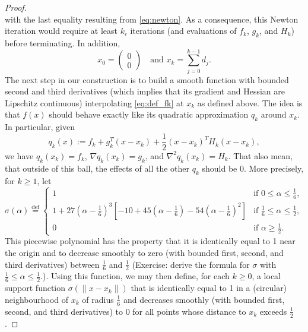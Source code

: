 \documentclass[10pt,a4paper]{article}
\begin{document}
\begin{proof}
\begin{equation*}
	\end{equation*}
	with the last equality resulting from \eqref{eq:newton}. As a consequence, this Newton iteration would require at least $k_\epsilon$ iterations (and evaluations of $f_k$, $g_k$, and $H_k$) before terminating. In addition,
	\begin{equation*}
		x_0 = \begin{pmatrix} 0 \\ 0 \end{pmatrix} \quad \text{and } x_k = \sum_{j=0}^{k-1} d_j. 
	\end{equation*}
	The next step in our construction is to build a smooth function with bounded second and third derivatives (which implies that its gradient and Hessian are Lipschitz continuous) interpolating \eqref{eq:def_fk} at $x_k$ as defined above. The idea is that $f(x)$ should behave exactly like its quadratic approximation $q_k$ around $x_k$. In particular, given 
	\begin{equation*}
		q_k(x) := f_k + g_k^T (x - x_k) + \frac{1}{2} (x - x_k)^T H_k (x - x_k),
	\end{equation*}
	we have $q_k(x_k) = f_k$, $\nabla q_k(x_k) = g_k$, and $\nabla^2 q_k(x_k) = H_k$. That also mean, that outside of this ball, the effects of all the other $q_k$ should be $0$. More precisely, for $k \geq 1$, let
	\begin{equation*}
		\sigma(\alpha) \stackrel{\text{def}}{=} \begin{cases}
			1 & \text{if } 0 \leq \alpha \leq \frac{1}{6}, \\
			1 + 27\left(\alpha - \frac{1}{6}\right)^3 \left[-10 + 45\left(\alpha - \frac{1}{6}\right) - 54\left(\alpha - \frac{1}{6}\right)^2\right] & \text{if } \frac{1}{6} \leq \alpha \leq \frac{1}{2}, \\
			0 & \text{if } \alpha \geq \frac{1}{2}.
		\end{cases}
	\end{equation*}
	This piecewise polynomial has the property that it is identically equal to 1 near the origin and to decrease smoothly to zero (with bounded first, second, and third derivatives) between $\frac{1}{6}$ and $\frac{1}{2}$ (Exercise: derive the formula for $\sigma$ with $\frac{1}{6}\leq \alpha\leq \frac{1}{2}$.). Using this function, we may then define, for each $k \geq 0$, a local support function $\sigma(\|x - x_k\|)$ that is identically equal to 1 in a (circular) neighbourhood of $x_k$ of radius $\frac{1}{6}$ and decreases smoothly (with bounded first, second, and third derivatives) to 0 for all points whose distance to $x_k$ exceeds $\frac{1}{2}$.

\end{proof}
\end{document}
